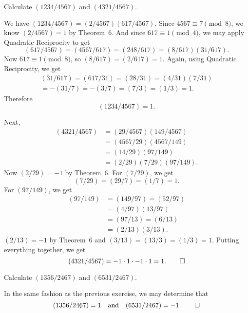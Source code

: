  Calculate $(1234/4567)$ and $(4321/4567)$.
\begin{solution}
  We have $(1234/4567) = (2/4567)(617/4567)$. Since
  $4567\equiv7\pmod8$, we know $(2/4567) = 1$ by Theorem~6. And since
  $617\equiv1\pmod4$, we may apply Quadratic Reciprocity to get
  \begin{equation*}
    (617/4567) = (4567/617) = (248/617) = (8/617)(31/617).
  \end{equation*}
  Now $617\equiv1\pmod8$, so $(8/617) = (2/617) = 1$. Again, using
  Quadratic Reciprocity, we get
  \begin{multline*}
    (31/617) = (617/31) = (28/31) = (4/31)(7/31) \\
    = -(31/7) = -(3/7) = (7/3) = (1/3) = 1.
  \end{multline*}
  Therefore
  \begin{equation*}
    (1234/4567) = 1.
  \end{equation*}

  Next,
  \begin{align*}
    (4321/4567) &= (29/4567)(149/4567) \\
                &= (4567/29)(4567/149) \\
                &= (14/29)(97/149) \\
                &= (2/29)(7/29)(97/149).
  \end{align*}
  Now $(2/29) = -1$ by Theorem~6. For $(7/29)$, we get
  \begin{equation*}
    (7/29) = (29/7) = (1/7) = 1.
  \end{equation*}
  For $(97/149)$, we get
  \begin{align*}
    (97/149) &= (149/97) = (52/97) \\
             &= (4/97)(13/97) \\
             &= (97/13) = (6/13) \\
             &= (2/13)(3/13).
  \end{align*}
  $(2/13) = -1$ by Theorem~6 and $(3/13) = (13/3) = (1/3) =
  1$. Putting everything together, we get
  \begin{equation*}
    (4321/4567) = -1\cdot1\cdot-1\cdot1 = 1. \qedhere
  \end{equation*}
\end{solution}

 Calculate $(1356/2467)$ and $(6531/2467)$.
\begin{solution}
  In the same fashion as the previous exercise, we may determine that
  \begin{equation*}
    (1356/2467) = 1
    \quad\text{and}\quad
    (6531/2467) = -1. \qedhere
  \end{equation*}
\end{solution}
